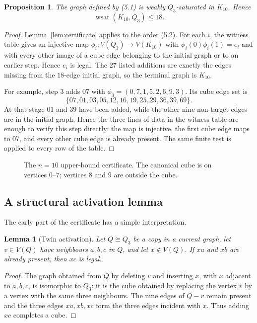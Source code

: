\documentclass[11pt]{article}
\numberwithin{equation}{section}
\newtheorem{proposition}[theorem]{Proposition}
\newtheorem{lemma}[theorem]{Lemma}
\newcommand{\wsat}{\operatorname{wsat}}
\begin{document}
\begin{proposition}\label{prop:n10upper}
The graph defined by (5.1) is weakly $Q_3$-saturated in $K_{10}$. Hence
\[
\wsat(K_{10},Q_3)\le18.
\]
\end{proposition}

\begin{proof}
Lemma~\ref{lem:certificate} applies to the order (5.2). For each $i$, the witness table gives an injective map $\phi_i:V(Q_3)\to V(K_{10})$ with $\phi_i(0)\phi_i(1)=e_i$ and with every other image of a cube edge belonging to the initial graph or to an earlier step. Hence $e_i$ is legal. The $27$ listed additions are exactly the edges missing from the $18$-edge initial graph, so the terminal graph is $K_{10}$.

For example, step $3$ adds $07$ with
$\phi_3=(0,7,1,5,2,6,9,3)$. Its cube edge set is
\[
\{07,01,03,05,12,16,19,25,29,36,39,69\}.
\]
At that stage $01$ and $39$ have been added, while the other nine non-target
edges are in the initial graph. Hence the three lines of data in the witness
table are enough to verify this step directly: the map is injective, the first
cube edge maps to $07$, and every other cube edge is already present. The same
finite test is applied to every row of the table.
\end{proof}

\begin{figure}[t]
\centering
\resizebox{0.72\linewidth}{!}{}
\caption{The $n=10$ upper-bound certificate. The canonical cube is on vertices $0$--$7$; vertices $8$ and $9$ are outside the cube.}
\label{fig:n10seed}
\end{figure}

\subsection{A structural activation lemma}
The early part of the certificate has a simple interpretation.

\begin{lemma}[Twin activation]\label{lem:twin}
Let $Q\cong Q_3$ be a copy in a current graph, let $v\in V(Q)$ have neighbours $a,b,c$ in $Q$, and let $x\notin V(Q)$. If $xa$ and $xb$ are already present, then $xc$ is legal.
\end{lemma}

\begin{proof}
The graph obtained from $Q$ by deleting $v$ and inserting $x$, with $x$ adjacent to $a,b,c$, is isomorphic to $Q_3$: it is the cube obtained by replacing the vertex $v$ by a vertex with the same three neighbours. The nine edges of $Q-v$ remain present and the three edges $xa,xb,xc$ form the three edges incident with $x$. Thus adding $xc$ completes a cube.
\end{proof}
\end{document}
